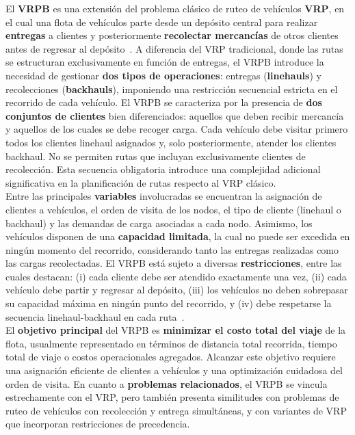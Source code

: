 \documentclass[letter, 10pt]{article}
\begin{document}
El \textbf{VRPB} es una extensi\'on del problema cl\'asico de ruteo de veh\'iculos \textbf{VRP}, en el cual una flota de veh\'iculos parte desde un dep\'osito central para realizar \textbf{entregas} a clientes y posteriormente \textbf{recolectar mercanc\'ias} de otros clientes antes de regresar al dep\'osito~\cite{goetschalckx1989vehicle}. A diferencia del VRP tradicional, donde las rutas se estructuran exclusivamente en funci\'on de entregas, el VRPB introduce la necesidad de gestionar \textbf{dos tipos de operaciones}: entregas (\textbf{linehauls}) y recolecciones (\textbf{backhauls}), imponiendo una restricci\'on secuencial estricta en el recorrido de cada veh\'iculo. El VRPB se caracteriza por la presencia de \textbf{dos conjuntos de clientes} bien diferenciados: aquellos que deben recibir mercanc\'ia y aquellos de los cuales se debe recoger carga. Cada veh\'iculo debe visitar primero todos los clientes linehaul asignados y, solo posteriormente, atender los clientes backhaul. No se permiten rutas que incluyan exclusivamente clientes de recolecci\'on. Esta secuencia obligatoria introduce una complejidad adicional significativa en la planificaci\'on de rutas respecto al VRP cl\'asico.\\

Entre las principales \textbf{variables} involucradas se encuentran la asignaci\'on de clientes a veh\'iculos, el orden de visita de los nodos, el tipo de cliente (linehaul o backhaul) y las demandas de carga asociadas a cada nodo. Asimismo, los veh\'iculos disponen de una \textbf{capacidad limitada}, la cual no puede ser excedida en ning\'un momento del recorrido, considerando tanto las entregas realizadas como las cargas recolectadas. El VRPB est\'a sujeto a diversas \textbf{restricciones}, entre las cuales destacan: (i) cada cliente debe ser atendido exactamente una vez, (ii) cada veh\'iculo debe partir y regresar al dep\'osito, (iii) los veh\'iculos no deben sobrepasar su capacidad m\'axima en ning\'un punto del recorrido, y (iv) debe respetarse la secuencia linehaul-backhaul en cada ruta~\cite{goetschalckx1989vehicle}.\\

El \textbf{objetivo principal} del VRPB es \textbf{minimizar el costo total del viaje} de la flota, usualmente representado en t\'erminos de distancia total recorrida, tiempo total de viaje o costos operacionales agregados. Alcanzar este objetivo requiere una asignaci\'on eficiente de clientes a veh\'iculos y una optimizaci\'on cuidadosa del orden de visita. En cuanto a \textbf{problemas relacionados}, el VRPB se vincula estrechamente con el VRP, pero tambi\'en presenta similitudes con problemas de ruteo de veh\'iculos con recolecci\'on y entrega simult\'aneas, y con variantes de VRP que incorporan restricciones de precedencia.
\end{document}
